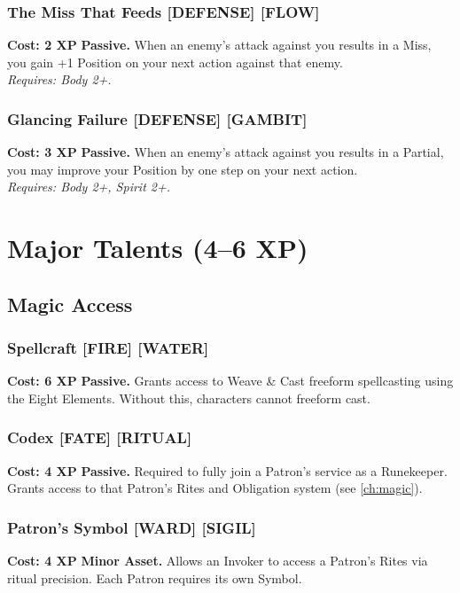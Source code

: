 \subsubsection*{The Miss That Feeds \textnormal{[DEFENSE] [FLOW]}}
\label{talent:miss-that-feeds}
\textbf{Cost: 2 XP} \textbf{Passive.}
When an enemy's attack against you results in a Miss, you gain +1 Position on your next action against that enemy. \\
\textit{Requires: Body 2+.}

\subsubsection*{Glancing Failure \textnormal{[DEFENSE] [GAMBIT]}}
\label{talent:glancing-failure}
\textbf{Cost: 3 XP} \textbf{Passive.}
When an enemy's attack against you results in a Partial, you may improve your Position by one step on your next action. \\
\textit{Requires: Body 2+, Spirit 2+.}

\section{Major Talents (4--6 XP)}
\label{sec:major-talents}

\subsection*{Magic Access}
\label{sec:major-magic-access}

\subsubsection*{Spellcraft \textnormal{[FIRE] [WATER]}}
\label{talent:spellcraft-major}
\textbf{Cost: 6 XP} \textbf{Passive.} Grants access to Weave \& Cast freeform spellcasting using the Eight Elements. Without this, characters cannot freeform cast.

\subsubsection*{Codex \textnormal{[FATE] [RITUAL]}}
\label{talent:codex}
\textbf{Cost: 4 XP} \textbf{Passive.} Required to fully join a Patron's service as a Runekeeper. Grants access to that Patron's Rites and Obligation system (see \ref{ch:magic}).

\subsubsection*{Patron's Symbol \textnormal{[WARD] [SIGIL]}}
\label{talent:patrons-symbol}
\textbf{Cost: 4 XP} \textbf{Minor Asset.} Allows an Invoker to access a Patron's Rites via ritual precision. Each Patron requires its own Symbol.

